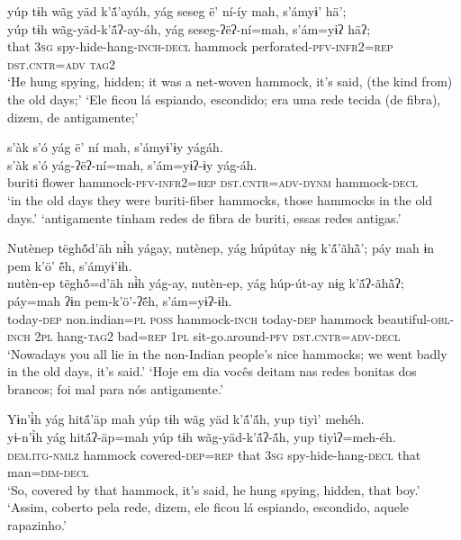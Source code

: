 \documentclass[output=paper,
modfonts,nonflat
]{langsci/langscibook}
\begin{document}
\ea  yúp tɨh wãg yäd k’ã́’ayáh, yág seseg ë’ ní-íy mah, s’ámyɨ’ hä’;\\ 
\gll yúp tɨh wãg-yäd-k’ã́ʔ-ay-áh, yág seseg-ʔëʔ-ní=mah, s’ám=yɨʔ häʔ;\\
     that \textsc{3sg} spy-hide-hang\textsc{-inch-decl} hammock perforated\textsc{-pfv-infr2=rep} \textsc{dst.cntr=adv} \textsc{tag2}\\
\glt ‘He hung spying, hidden; it was a net-woven hammock, it’s said, (the kind from) the old days;'
\glt ‘Ele ficou lá espiando, escondido; era uma rede tecida (de fibra), dizem, de antigamente;'
\z 

\newpage
\ea  s’àk s’ó yág ë’ ní mah, s’ámyɨ’ɨy yágáh.\\ 
\gll s’àk s’ó yág-ʔëʔ-ní=mah, s’ám=yɨʔ-ɨy yág-áh.\\
     buriti flower hammock\textsc{-pfv-infr2=rep} \textsc{dst.cntr=adv-dynm} hammock\textsc{-decl}\\
\glt ‘in the old days they were buriti-fiber hammocks, those hammocks in the old days.'{\footnotemark}
\glt ‘antigamente tinham redes de fibra de buriti, essas redes antigas.'
\z 

\ea Nutènep tëghṍd’äh nɨ̀h yágay, nutènep, yág húpútay nɨg k’ã́’ãhä̀’; páy mah ɨn pem k’ö’ ë́h, s’ámyɨ’ɨh.\\
\gll nutèn-ep tëghṍ=d’äh nɨ̀h yág-ay, nutèn-ep, yág húp-út-ay nɨg k’ã́ʔ-ãhä̀ʔ; páy=mah ʔɨn pem-k’ö’-ʔë́h, s’ám=yɨʔ-ɨh.\\
	today\textsc{-dep} non.indian\textsc{=pl} \textsc{poss} hammock\textsc{-inch} today\textsc{-dep} hammock beautiful\textsc{-obl-inch} \textsc{2pl} hang-\textsc{tag2} bad\textsc{=rep} \textsc{1pl} sit-go.around-\textsc{pfv} \textsc{dst.cntr=adv-decl}\\
\glt ‘Nowadays you all lie in the non-Indian people’s nice hammocks; we went badly in the old days, it's said.' 
\glt ‘Hoje em dia vocês deitam nas redes bonitas dos brancos; foi mal para nós antigamente.'
\z

\ea  Yɨn’ɨ̀h yág hitä́’äp mah yúp tɨh wãg yäd k’ã́’ã́h, yup tiyì’ mehéh.\\ 
\gll yɨ-n’ɨ̀h yág hitä́ʔ-äp=mah yúp tɨh wãg-yäd-k’ã́ʔ-ã́h, yup tiyìʔ=meh-éh.\\
     \textsc{dem.itg-nmlz} hammock covered\textsc{-dep=rep} that \textsc{3sg} spy-hide-hang\textsc{-decl} that man\textsc{=dim-decl}\\
\glt ‘So, covered by that hammock, it's said, he hung spying, hidden, that boy.'\hspace*{-4mm}
\glt ‘Assim, coberto pela rede, dizem, ele ficou lá espiando, escondido, aquele rapazinho.'
\z 
\end{document}
